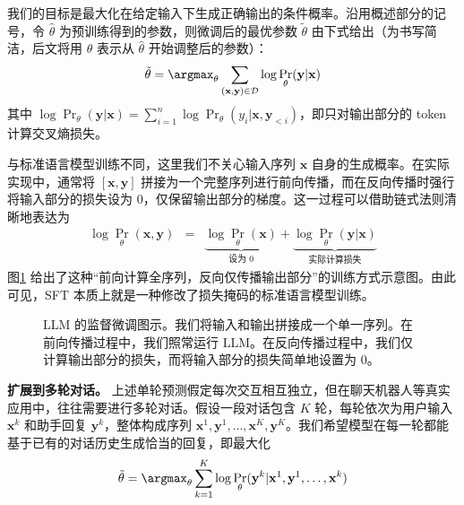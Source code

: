 \noindent 我们的目标是最大化在给定输入下生成正确输出的条件概率。沿用概述部分的记号，令 $\hat{\theta}$ 为预训练得到的参数，则微调后的最优参数 $\tilde{\theta}$ 由下式给出（为书写简洁，后文将用 $\theta$ 表示从 $\hat{\theta}$ 开始调整后的参数）：
\begin{eqnarray}
\tilde{\theta} = \argmax_{\theta} \sum_{(\mathbf{x},\mathbf{y}) \in \mathcal{D}} \log \Pr_{\theta}(\mathbf{y}|\mathbf{x})
\label{eq:sft-objective}
\end{eqnarray}
其中 $\log \Pr_{\theta}(\mathbf{y}|\mathbf{x}) = \sum_{i=1}^{n} \log \Pr_{\theta}(y_i|\mathbf{x},\mathbf{y}_{<i})$，即只对输出部分的 token 计算交叉熵损失。

与标准语言模型训练不同，这里我们不关心输入序列 $\mathbf{x}$ 自身的生成概率。在实际实现中，通常将 $[\mathbf{x}, \mathbf{y}]$ 拼接为一个完整序列进行前向传播，而在反向传播时强行将输入部分的损失设为 $0$，仅保留输出部分的梯度。这一过程可以借助链式法则清晰地表达为
\begin{eqnarray}
\log \Pr_{\theta}(\mathbf{x},\mathbf{y}) &=& \underbrace{\log \Pr_{\theta}(\mathbf{x})}_{\text{设为 } 0} + \underbrace{\log \Pr_{\theta}(\mathbf{y}|\mathbf{x})}_{\text{实际计算损失}}
\label{eq:sft-chain}
\end{eqnarray}
图\ref{fig:sft-forward-backward} 给出了这种“前向计算全序列，反向仅传播输出部分”的训练方式示意图。由此可见，SFT 本质上就是一种修改了损失掩码的标准语言模型训练。

\begin{figure}[!t]
\centering

\caption{LLM 的监督微调图示。我们将输入和输出拼接成一个单一序列。在前向传播过程中，我们照常运行 LLM。在反向传播过程中，我们仅计算输出部分的损失，而将输入部分的损失简单地设置为 0。}
\label{fig:sft-forward-backward}
\end{figure}

\vspace{0.5em}
\noindent\textbf{扩展到多轮对话。}
上述单轮预测假定每次交互相互独立，但在聊天机器人等真实应用中，往往需要进行多轮对话。假设一段对话包含 $K$ 轮，每轮依次为用户输入 $\mathbf{x}^k$ 和助手回复 $\mathbf{y}^k$，整体构成序列 $\mathbf{x}^1,\mathbf{y}^1,\dots,\mathbf{x}^K,\mathbf{y}^K$。我们希望模型在每一轮都能基于已有的对话历史生成恰当的回复，即最大化
\begin{eqnarray}
\tilde{\theta} = \argmax_{\theta} \sum_{k=1}^{K} \log \Pr_{\theta}(\mathbf{y}^k|\mathbf{x}^1,\mathbf{y}^1,\dots,\mathbf{x}^k)
\label{eq:multi-turn-obj}
\end{eqnarray}

